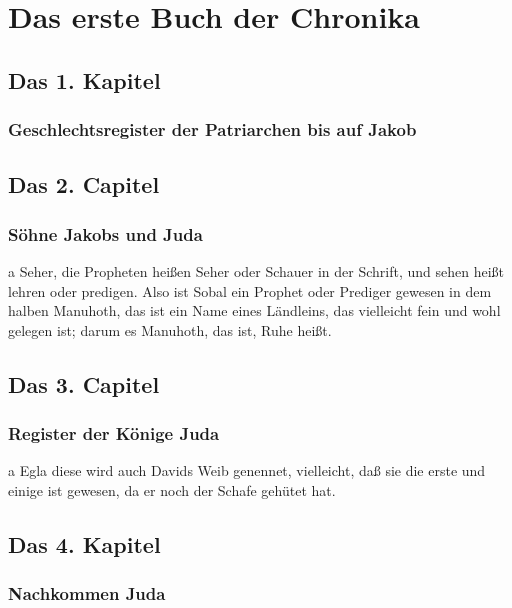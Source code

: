 
\part{Das erste Buch der Chronika}

\chapter{Das 1. Kapitel}

\section[Geschlechtsregister der Patriarchen bis auf Jakob]{Geschlechtsregister der Patriarchen bis auf Jakob}

\chapter{Das 2. Capitel}

\section[Söhne Jakobs und Juda]{Söhne Jakobs und Juda}

a Seher, die Propheten heißen Seher oder Schauer in der Schrift, und sehen heißt lehren oder predigen. Also ist Sobal ein Prophet oder Prediger gewesen in dem halben Manuhoth, das ist ein Name eines Ländleins, das vielleicht fein und wohl gelegen ist; darum es Manuhoth, das ist, Ruhe heißt.

\chapter{Das 3. Capitel}

\section[Register der Könige Juda]{Register der Könige Juda}

a Egla diese wird auch Davids Weib genennet, vielleicht, daß sie die erste und einige ist gewesen, da er noch der Schafe gehütet hat.

\chapter{Das 4. Kapitel}

\section[Nachkommen Juda]{Nachkommen Juda}

